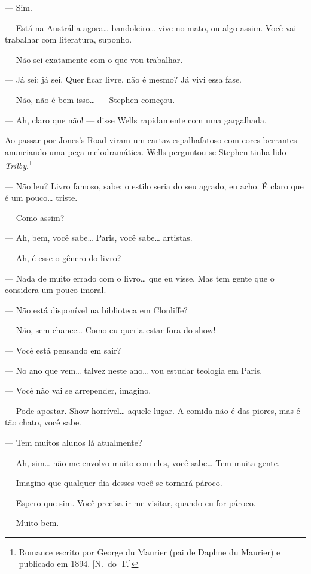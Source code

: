 --- Sim.

--- Está na Austrália agora\ldots{} bandoleiro\ldots{} vive no mato, ou
algo assim.  Você vai trabalhar com literatura, suponho.

--- Não sei exatamente com o que vou trabalhar.

--- Já sei: já sei.  Quer ficar livre, não é mesmo?  \label{ja"-vivi} Já vivi
essa fase.

--- Não, não é bem isso\ldots{} --- Stephen começou.

--- Ah, claro que não! --- disse Wells rapidamente com uma
gargalhada.

Ao passar por Jones’s Road viram um cartaz espalhafatoso com cores
berrantes anunciando uma peça melodramática.  Wells perguntou se
Stephen tinha lido \textit{Trilby}.\footnote[\setcounter{symbol}{2}]{ Romance escrito por
George du Maurier (pai de Daphne du Maurier) e publicado em 1894. [N.~do~T.]}

--- Não leu?  Livro famoso, sabe; o estilo seria do seu agrado,
eu acho.  É claro que é um pouco\ldots{} triste.

--- Como assim?

--- Ah, bem, você sabe\ldots{} Paris, você sabe\ldots{} artistas.

--- Ah, é esse o gênero do livro?

--- Nada de muito errado com o livro\ldots{} que eu visse.  Mas tem
gente que o considera um pouco imoral.

--- Não está disponível na biblioteca em Clonliffe?

--- Não, sem chance\ldots{}  Como eu queria estar fora do show!		

--- Você está pensando em sair?

--- No ano que vem\ldots{} talvez neste ano\ldots{} vou estudar teologia em
Paris.

--- Você não vai se arrepender, imagino.

--- Pode apostar.  Show horrível\ldots{} aquele lugar.  A comida não é		
das piores, mas é tão chato, você sabe.

--- Tem muitos alunos lá atualmente?

--- Ah, sim\ldots{} não me envolvo muito com eles, você sabe\ldots{} Tem
muita gente.

--- Imagino que qualquer dia desses você se tornará pároco.

--- Espero que sim.  Você precisa ir me visitar, quando eu for
pároco.

--- Muito bem.

